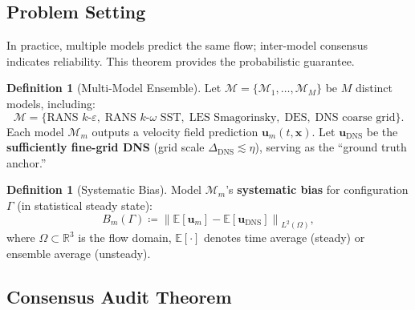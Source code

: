 \documentclass[11pt,a4paper]{article}
\theoremstyle{definition}
\newtheorem{definition}[theorem]{Definition}
\theoremstyle{remark}
\newcommand{\R}{\mathbb{R}}
\newcommand{\E}{\mathbb{E}}
\newcommand{\norm}[1]{\left\lVert#1\right\rVert}
\newcommand{\Kolmogorov}{\eta}
\begin{document}
\subsection{Problem Setting}

In practice, multiple models predict the same flow; inter-model consensus indicates reliability. This theorem provides the probabilistic guarantee.

\begin{definition}[Multi-Model Ensemble]
\label{def:ensemble}
Let $\mathscr{M} = \{\mathcal{M}_1, \dots, \mathcal{M}_M\}$ be $M$ distinct models, including:
\begin{equation}
  \mathscr{M} = \{
    \text{RANS } k\text{-}\varepsilon,\;
    \text{RANS } k\text{-}\omega\text{ SST},\;
    \text{LES Smagorinsky},\;
    \text{DES},\;
    \text{DNS coarse grid}
  \}.
\end{equation}
Each model $\mathcal{M}_m$ outputs a velocity field prediction $\bm{u}_m(t, \bm{x})$. Let $\bm{u}_{\text{DNS}}$ be the \textbf{sufficiently fine-grid DNS} (grid scale $\Delta_{\text{DNS}} \lesssim \Kolmogorov$), serving as the ``ground truth anchor.''
\end{definition}

\begin{definition}[Systematic Bias]
\label{def:bias}
Model $\mathcal{M}_m$'s \textbf{systematic bias} for configuration $\Gamma$ (in statistical steady state):
\begin{equation}\label{eq:bias_def}
  B_m(\Gamma) \coloneqq \norm{\E[\bm{u}_m] - \E[\bm{u}_{\text{DNS}}]}_{L^2(\Omega)},
\end{equation}
where $\Omega \subset \R^3$ is the flow domain, $\E[\cdot]$ denotes time average (steady) or ensemble average (unsteady).
\end{definition}

\subsection{Consensus Audit Theorem}
\end{document}

